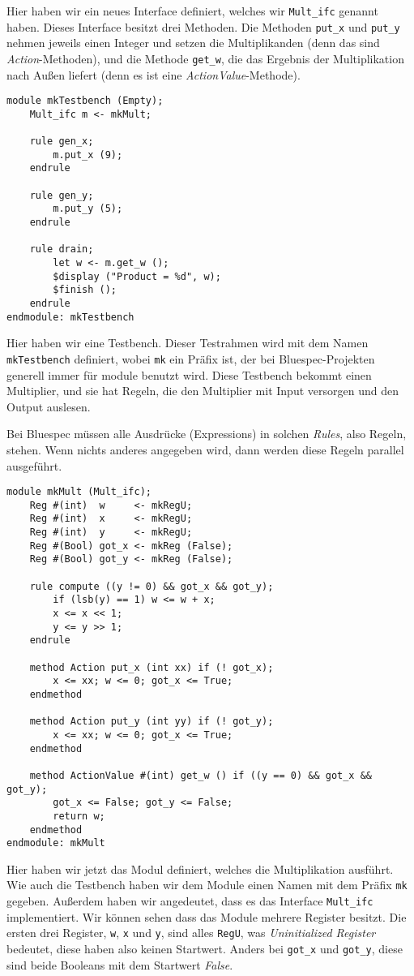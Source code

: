 \documentclass[ngerman]{scrartcl}
\begin{document}
Hier haben wir ein neues Interface definiert, welches wir \verb|Mult_ifc| genannt haben. Dieses Interface besitzt drei Methoden. Die Methoden \verb|put_x| und \verb|put_y| nehmen jeweils einen Integer und setzen die Multiplikanden (denn das sind \emph{Action}-Methoden), und die Methode \verb|get_w|, die das Ergebnis der Multiplikation nach Außen liefert (denn es ist eine \emph{ActionValue}-Methode). 
\begin{lstlisting}
module mkTestbench (Empty);
    Mult_ifc m <- mkMult;
    
    rule gen_x;
        m.put_x (9);
    endrule
    
    rule gen_y;
        m.put_y (5);
    endrule
    
    rule drain;
        let w <- m.get_w ();
        $display ("Product = %d", w);
        $finish ();
    endrule
endmodule: mkTestbench  
\end{lstlisting}
Hier haben wir eine Testbench. Dieser Testrahmen wird mit dem Namen \verb|mkTestbench| definiert, wobei \verb|mk| ein Präfix ist, der bei Bluespec-Projekten generell immer für module benutzt wird. Diese Testbench bekommt einen Multiplier, und sie hat Regeln, die den Multiplier mit Input versorgen und den Output auslesen. 

Bei Bluespec müssen alle Ausdrücke (Expressions) in solchen \emph{Rules}, also Regeln, stehen. Wenn nichts anderes angegeben wird, dann werden diese Regeln parallel ausgeführt.
\begin{lstlisting}
module mkMult (Mult_ifc);
    Reg #(int)  w     <- mkRegU;
    Reg #(int)  x     <- mkRegU;
    Reg #(int)  y     <- mkRegU;
    Reg #(Bool) got_x <- mkReg (False);
    Reg #(Bool) got_y <- mkReg (False);
    
    rule compute ((y != 0) && got_x && got_y);
        if (lsb(y) == 1) w <= w + x;
        x <= x << 1;
        y <= y >> 1;
    endrule
    
    method Action put_x (int xx) if (! got_x);
        x <= xx; w <= 0; got_x <= True;
    endmethod
    
    method Action put_y (int yy) if (! got_y);
        x <= xx; w <= 0; got_x <= True;
    endmethod
    
    method ActionValue #(int) get_w () if ((y == 0) && got_x && got_y);
        got_x <= False; got_y <= False;
        return w;
    endmethod
endmodule: mkMult  
\end{lstlisting}
Hier haben wir jetzt das Modul definiert, welches die Multiplikation ausführt. Wie auch die Testbench haben wir dem Module einen Namen mit dem Präfix \verb|mk| gegeben. Außerdem haben wir angedeutet, dass es das Interface \verb|Mult_ifc| implementiert. Wir können sehen dass das Module mehrere Register besitzt. Die ersten drei Register, \verb|w|, \verb|x| und \verb|y|, sind alles \verb|RegU|, was \emph{Uninitialized Register} bedeutet, diese haben also keinen Startwert. Anders bei \verb|got_x| und \verb|got_y|, diese sind beide Booleans mit dem Startwert \emph{False}.
\end{document}
